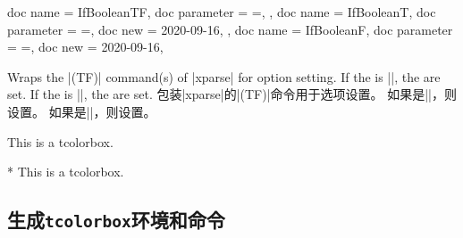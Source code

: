\medskip

\begin{docTcbKeys}[doc description = {no default}]
  {
    {
      doc name        = IfBooleanTF,
      doc parameter   = {=},
    },
    {
      doc name        = IfBooleanT,
      doc parameter   = {=},
      doc new         = 2020-09-16,
    },
    {
      doc name        = IfBooleanF,
      doc parameter   = {=},
      doc new         = 2020-09-16,
    }
  }
\begin{stripedbox}
Wraps the |\IfBoolean(TF)| command(s) of |xparse| for option setting.
If the  is |\BooleanTrue|, the  are set.
If the  is |\BooleanFalse|, the  are set.
\tcblower
包装|xparse|的|\IfBoolean(TF)|命令用于选项设置。
如果是|\BooleanTrue|，则设置。
如果是|\BooleanFalse|，则设置。
\end{stripedbox}
  

\begin{dispExample}

\begin{mybox}
This is a tcolorbox.
\end{mybox}

\begin{mybox}*
This is a tcolorbox.
\end{mybox}
\end{dispExample}
\end{docTcbKeys}

\subsection{生成\texttt{tcolorbox}环境和命令}\label{subsec:xparse_tcolorbox}

